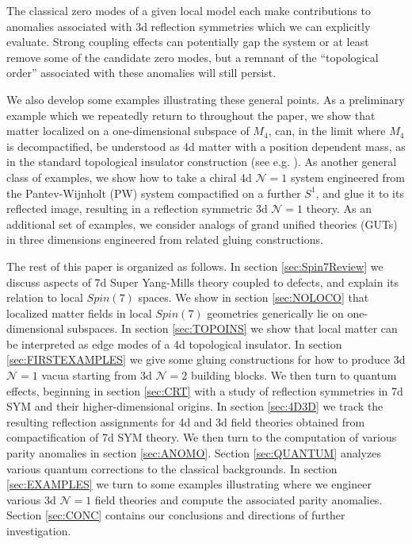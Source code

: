 \documentclass[12pt]{article}%
\numberwithin{equation}{section}
\renewcommand{\(}{\left(}
\renewcommand{\)}{\right)}
\renewcommand{\[}{\left[}
\renewcommand{\]}{\right]}
\begin{document}
The classical zero modes of a given local model each make contributions
to anomalies associated with 3d reflection symmetries which we can
explicitly evaluate. Strong coupling effects can potentially gap
the system or at least remove some of the candidate zero modes,
but a remnant of the ``topological order'' associated with these
anomalies will still persist.

We also develop some examples illustrating these general points.
As a preliminary example which we repeatedly return to throughout the paper,
we show that matter localized on a one-dimensional subspace of $M_4$, can, in the limit where $M_4$ is
decompactified, be understood as 4d matter with a position dependent mass, as in the standard
topological insulator construction (see e.g.
\cite{PhysRevLett.95.226801, PhysRevLett.96.106802, Seiberg:2016rsg}). As another general class of examples,
we show how to take a chiral 4d $\mathcal{N} = 1$ system engineered from the Pantev-Wijnholt (PW)
system compactified on a further $S^1$,
and glue it to its reflected image, resulting in a reflection symmetric 3d $\mathcal{N} = 1$ theory.
As an additional set of examples, we consider analogs of grand unified theories (GUTs) in three dimensions
engineered from related gluing constructions.

The rest of this paper is organized as follows. In section \ref{sec:Spin7Review} we discuss aspects of 7d Super Yang-Mills theory coupled to defects, and explain its relation to local $Spin(7)$ spaces. We show in section \ref{sec:NOLOCO} that localized matter fields in local $Spin(7)$ geometries generically lie on one-dimensional subspaces. In section \ref{sec:TOPOINS}
we show that local matter can be interpreted as edge modes of a 4d topological insulator. In section \ref{sec:FIRSTEXAMPLES} we
give some gluing constructions for how to produce 3d $\mathcal{N} = 1$ vacua starting from 3d $\mathcal{N} = 2$ building blocks.
We then turn to quantum effects, beginning in section \ref{sec:CRT} with a study of reflection symmetries in 7d SYM and their higher-dimensional origins. In section \ref{sec:4D3D} we track the resulting reflection assignments for 4d and 3d field theories obtained from
compactification of 7d SYM theory. We then turn to the computation of various parity anomalies
in section \ref{sec:ANOMO}. Section \ref{sec:QUANTUM} analyzes various
quantum corrections to the classical backgrounds. In section \ref{sec:EXAMPLES} we turn to some examples illustrating where we engineer various 3d $\mathcal{N} = 1$ field theories and compute the associated parity anomalies. Section \ref{sec:CONC} contains our conclusions and directions of further investigation.
\end{document}
